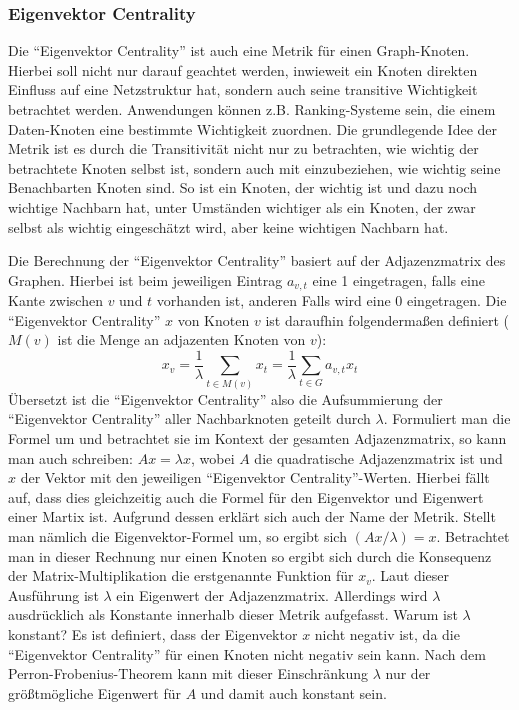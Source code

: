\documentclass[a4paper,12pt,ngerman,chapterprefix=false,listof=totoc,bibliography=totoc]{scrreprt}
\begin{document}
\subsubsection*{Eigenvektor Centrality}
{
Die "`Eigenvektor Centrality"' ist auch eine Metrik für einen Graph-Knoten. Hierbei soll nicht nur darauf geachtet werden, inwieweit ein Knoten direkten Einfluss auf eine Netzstruktur hat, sondern auch seine transitive Wichtigkeit betrachtet werden. Anwendungen können z.B. Ranking-Systeme sein, die einem Daten-Knoten eine bestimmte Wichtigkeit zuordnen. \cite{neo4j_eigenvector_2020} Die grundlegende Idee der Metrik ist es durch die Transitivität nicht nur zu betrachten, wie wichtig der betrachtete Knoten selbst ist, sondern auch mit einzubeziehen, wie wichtig seine Benachbarten Knoten sind. So ist ein Knoten, der wichtig ist und dazu noch wichtige Nachbarn hat, unter Umständen wichtiger als ein Knoten, der zwar selbst als wichtig eingeschätzt wird, aber keine wichtigen Nachbarn hat.

Die Berechnung der "`Eigenvektor Centrality"' basiert auf der Adjazenzmatrix des Graphen. Hierbei ist beim jeweiligen Eintrag \(a_{v,t}\) eine 1 eingetragen, falls eine Kante zwischen \(v\) und \(t\) vorhanden ist, anderen Falls wird eine 0 eingetragen. Die "`Eigenvektor Centrality"' \(x\) von Knoten \(v\) ist daraufhin folgendermaßen definiert (\(M(v)\) ist die Menge an adjazenten Knoten von \(v\)): \cite{bihari_eigenvector_2015}
\[
	x_v=\frac{1}{\lambda}\sum_{t\in M(v)}x_t=\frac{1}{\lambda}\sum_{t\in G}a_{v,t}x_t
\]
Übersetzt ist die "`Eigenvektor Centrality"' also die Aufsummierung der "`Eigenvektor Centrality"' aller Nachbarknoten geteilt durch \(\lambda\). Formuliert man die Formel um und betrachtet sie im Kontext der gesamten Adjazenzmatrix, so kann man auch schreiben: \(Ax=\lambda x\), wobei \(A\) die quadratische Adjazenzmatrix ist und \(x\) der Vektor mit den jeweiligen "`Eigenvektor Centrality"'-Werten. Hierbei fällt auf, dass dies gleichzeitig auch die Formel für den Eigenvektor und Eigenwert einer Martix ist. Aufgrund dessen erklärt sich auch der Name der Metrik. Stellt man nämlich die Eigenvektor-Formel um, so ergibt sich \((Ax/\lambda)=x\). Betrachtet man in dieser Rechnung nur einen Knoten so ergibt sich durch die Konsequenz der Matrix-Multiplikation die erstgenannte Funktion für \(x_v\). Laut dieser Ausführung ist \(\lambda\) ein Eigenwert der Adjazenzmatrix. Allerdings wird \(\lambda\) ausdrücklich als Konstante innerhalb dieser Metrik aufgefasst. Warum ist \(\lambda\) konstant? Es ist definiert, dass der Eigenvektor \(x\) nicht negativ ist, da die "`Eigenvektor Centrality"' für einen Knoten nicht negativ sein kann. Nach dem Perron-Frobenius-Theorem kann mit dieser Einschränkung \(\lambda\) nur der größtmögliche Eigenwert für \(A\) und damit auch konstant sein.

}
\end{document}

